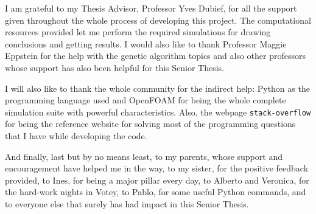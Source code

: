 \begin{acknowledgements}

I am grateful to my Thesis Advisor, Professor Yves Dubief, for all the support given throughout the whole process of developing this project. The computational resources provided let me perform the required simulations for drawing conclusions and getting results. I would also like to thank Professor Maggie Eppstein for the help with the genetic algorithm topics and also other professors whose support has also been helpful for this Senior Thesis.

I will also like to thank the whole community for the indirect help: Python as the programming language used and OpenFOAM for being the whole complete simulation suite with powerful characteristics. Also, the webpage \texttt{stack-overflow} for being the reference website for solving most of the programming questions that I have while developing the code. 

And finally, last but by no means least, to my parents, whose support and encouragement have helped me in the way, to my sister, for the positive feedback provided, to Ines, for being a major pillar every day, to Alberto and Veronica, for the hard-work nights in Votey, to Pablo, for some useful Python commands, and to everyone else that surely has had impact in this Senior Thesis.

\end{acknowledgements}